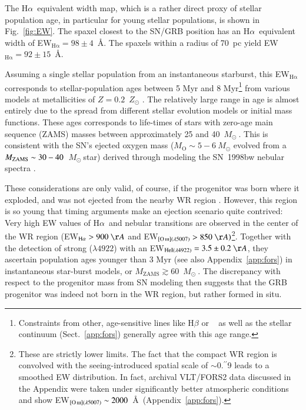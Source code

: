 \documentclass[traditabstract, referee]{aa}
\newcommand{\farc}{\hbox{$.\!\!^{\prime\prime}$}}
\newcommand{\ha}{H$\alpha$}
\newcommand{\hei}{\ion{He}{i}}
\newcommand{\oiii}{[\ion{O}{iii}]}
\newcommand{\Msun}{$M_\odot~$}
\begin{document}
The \ha~equivalent width map, which is a rather direct proxy of stellar population age, in particular for young stellar populations, is shown in Fig.~\ref{fig:EW}. The spaxel closest to the SN/GRB position has an \ha~equivalent width of EW$_{\mathrm{H\alpha}}=98\pm4$~\AA. The spaxels within a radius of 70~pc yield EW$_{\mathrm{H\alpha}}=92\pm15$~\AA. 

Assuming a single stellar population from an instantaneous starburst, this EW$_{\mathrm{H\alpha}}$ corresponds to stellar-population ages between 5 Myr and 8 Myr\footnote{{Constraints from other, age-sensitive lines like H$\beta$ or \hei~\citep{1999ApJS..125..489G} as well as the stellar continuum (Sect.~\ref{app:fors}) generally agree with this age range.}} from various models at metallicities of $Z=0.2$~$Z_{\odot}$ \citep[see e.g.][and references therein]{2013ApJ...779..170L, 2016arXiv160703446K}. The relatively large range in age is almost entirely due to the spread from different stellar evolution models or initial mass functions. These ages corresponds to life-times of stars with zero-age main sequence (ZAMS) masses between approximately 25 and 40~\Msun \citep{1994A&AS..105...29F, 2005A&A...429..581M}. This is consistent with the SN's ejected oxygen mass ($M_{\mathrm{O}}\sim5-6~M_{\odot}$ evolved from a $M_{\rm{ZAMS}} \sim 30-40$~\Msun star) derived through modeling the SN~1998bw nebular spectra \citep{2001ApJ...559.1047M, 2006ApJ...640..854M}.

These considerations are only valid, of course, if the progenitor was born where it exploded, and was not ejected from the nearby WR region \citep{2006A&A...454..103H}. However, this region is so young that timing arguments make an ejection scenario quite contrived: Very high EW values of \ha~and nebular transitions are observed in the center of the WR region (EW$_{\mathrm{H\alpha}}>900~\AA$ and EW$_{\oiii(\lambda5007)}>850~\AA)$\footnote{These are strictly lower limits. The fact that the compact WR region is convolved with the seeing-introduced spatial scale of $\sim$0\farc{9} leads to a smoothed EW distribution. In fact, archival VLT/FORS2 data discussed in the Appendix were taken under significantly better atmospheric conditions and show EW$_{\oiii(\lambda5007)}\sim2000$~\AA~(Appendix~\ref{app:fors}).}. {Together with the detection of strong \hei($\lambda4922$) with an EW$_{\mathrm{HeI(\lambda4922)}}=3.5\pm0.2~\AA$}, they ascertain population ages younger than 3 Myr (see also Appendix~\ref{app:fors}) in instantaneous star-burst models, or $M_{\mathrm{ZAMS}} \gtrsim 60$~\Msun \citep[see e.g.][and references therein for a similar case]{2015MNRAS.451L..65T}. The discrepancy with respect to the progenitor mass from SN modeling \citep[e.g.,][]{2001ApJ...559.1047M, 2006ApJ...640..854M} then suggests that the GRB progenitor was indeed not born in the WR region, but rather formed in situ.
\end{document}
